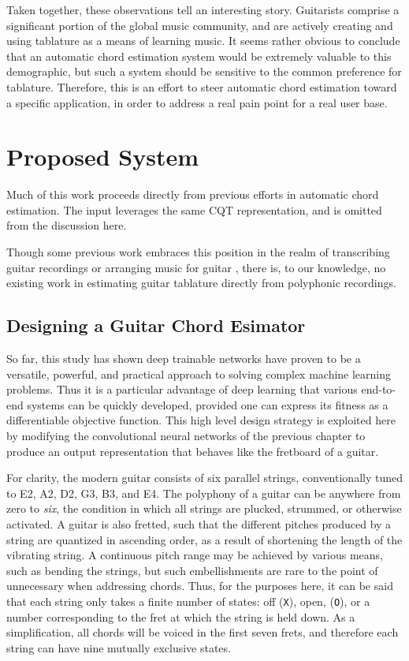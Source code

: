 Taken together, these observations tell an interesting story.
Guitarists comprise a significant portion of the global music community, and are actively creating and using tablature as a means of learning music.
It seems rather obvious to conclude that an automatic chord estimation system would be extremely valuable to this demographic, but such a system should be sensitive to the common preference for tablature.
Therefore, this is an effort to steer automatic chord estimation toward a specific application, in order to address a real pain point for a real user base.


\section{Proposed System}

Much of this work proceeds directly from previous efforts in automatic chord estimation.
The input leverages the same CQT representation, and is omitted from the discussion here.

Though some previous work embraces this position in the realm of transcribing guitar recordings \cite{Barbancho2012} or arranging music for guitar \cite{Hori2013}, there is, to our knowledge, no existing work in estimating guitar tablature directly from polyphonic recordings.


\subsection{Designing a Guitar Chord Esimator}
\label{subsec:design}

So far, this study has shown deep trainable networks have proven to be a versatile, powerful, and practical approach to solving complex machine learning problems.
Thus it is a particular advantage of deep learning that various end-to-end systems can be quickly developed, provided one can express its fitness as a differentiable objective function.
This high level design strategy is exploited here by modifying the convolutional neural networks of the previous chapter to produce an output representation that behaves like the fretboard of a guitar.

For clarity, the modern guitar consists of six parallel strings, conventionally tuned to E2, A2, D2, G3, B3, and E4.
The polyphony of a guitar can be anywhere from zero to \emph{six}, the condition in which all strings are plucked, strummed, or otherwise activated.
A guitar is also fretted, such that the different pitches produced by a string are quantized in ascending order, as a result of shortening the length of the vibrating string.
A continuous pitch range may be achieved by various means, such as bending the strings, but such embellishments are rare to the point of unnecessary when addressing chords.
Thus, for the purposes here, it can be said that each string only takes a finite number of states: off (\texttt{X}), open, (\texttt{O}), or a number corresponding to the fret at which the string is held down.
As a simplification, all chords will be voiced in the first seven frets, and therefore each string can have nine mutually exclusive states.

